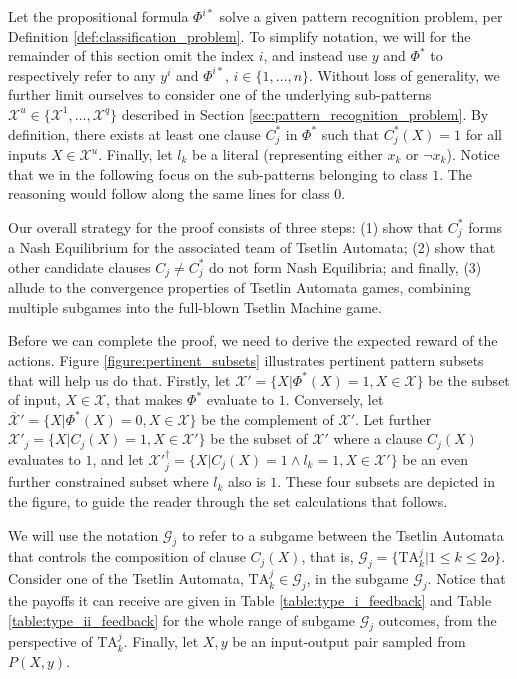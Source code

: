 \documentclass[11pt,a4paper]{article}
\newcommand{\True}{\mbox{1}}
\newcommand{\False}{\mbox{0}}
\begin{document}
Let the propositional formula $\Phi^{i*}$ solve a given pattern recognition problem, per Definition \ref{def:classification_problem}. To simplify notation, we will for the remainder of this section omit the index $i$, and instead use $y$ and $\Phi^*$ to respectively refer to any $y^i$ and $\Phi^{i*}$, $i \in \{1, \ldots, n\}$. Without loss of generality, we further limit ourselves to consider one of the underlying sub-patterns $\mathcal{X}^u \in \{\mathcal{X}^1, \ldots, \mathcal{X}^q\}$ described in Section \ref{sec:pattern_recognition_problem}. By definition, there exists at least one clause  $C^*_j$ in $\Phi^*$ such that $C^*_j(X) = 1$ for all inputs $X \in \mathcal{X}^u$. Finally, let $l_k$ be a literal (representing either $x_k$ or $\lnot x_k$). Notice that we in the following focus on the sub-patterns belonging to class $1$. The reasoning would follow along the same lines for class $0$.

Our overall strategy for the proof consists of three steps: (1) show that $C^*_j$ forms a Nash Equilibrium for the associated team of Tsetlin Automata; (2) show that other candidate clauses $C_j \ne C^*_j$ do not form Nash Equilibria; and finally, (3) allude to the convergence properties of Tsetlin Automata games, combining multiple subgames into the full-blown Tsetlin Machine game.

Before we can complete the proof, we need to derive the expected reward of the actions. Figure \ref{figure:pertinent_subsets} illustrates pertinent pattern subsets that will help us do that. Firstly, let $\mathcal{X}' = \{X | \Phi^*(X) = \True, X \in \mathcal{X}\}$ be the subset of input, $X \in \mathcal{X}$, that makes $\Phi^*$ evaluate to $\True$. Conversely, let $\overline{\mathcal{X}}' = \{X | \Phi^*(X) = \False, X \in \mathcal{X}\}$ be the complement of $\mathcal{X}'$. Let further $\mathcal{X}'_j = \{X | C_j(X) = \True, X \in \mathcal{X}'\}$ be the subset of $\mathcal{X}'$ where a clause $C_j(X)$ evaluates to $\True$, and let $\mathcal{X}'^\dagger_j = \{X | C_j(X) = \True \land l_k = \True, X \in \mathcal{X}'\}$ be an even further constrained subset where $l_k$ also is $\True$. These four subsets are depicted in the figure, to guide the reader through the set calculations that follows.

We will use the notation $\mathcal{G}_j$ to refer to a subgame between the Tsetlin Automata that controls the composition of clause $C_j(X)$, that is, $\mathcal{G}_j = \{\mathrm{TA}_k^j | 1 \le k \le 2o\}$. Consider one of the Tsetlin Automata, $\mathrm{TA}^j_k \in \mathcal{G}_j$, in the subgame $\mathcal{G}_j$. Notice that the payoffs it can receive are given in Table \ref{table:type_i_feedback} and Table \ref{table:type_ii_feedback} for the  whole range of subgame $\mathcal{G}_j$ outcomes, from the perspective of $\mathrm{TA}^j_k$. Finally, let $X, y$ be an input-output pair sampled from $P(X, y)$. 
\end{document}
